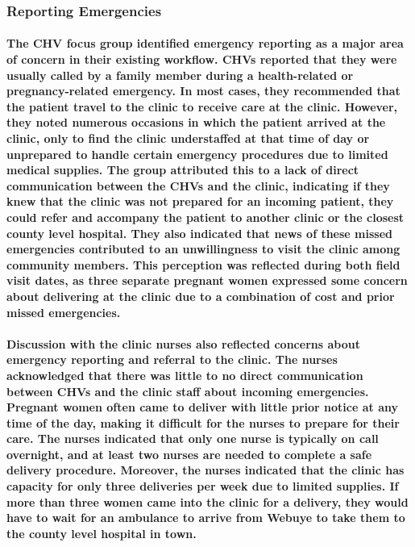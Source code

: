 \subsubsection{Reporting Emergencies}
\paragraph{The CHV focus group identified emergency reporting as a major area of concern in their existing workflow. CHVs reported that they were usually called by a family member during a health-related or pregnancy-related emergency. In most cases, they recommended that the patient travel to the clinic to receive care at the clinic. However, they noted numerous occasions in which the patient arrived at the clinic, only to find the clinic understaffed at that time of day or unprepared to handle certain emergency procedures due to limited medical supplies. The group attributed this to a lack of direct communication between the CHVs and the clinic, indicating if they knew that the clinic was not prepared for an incoming patient, they could refer and accompany the patient to another clinic or the closest county level hospital. They also indicated that news of these missed emergencies contributed to an unwillingness to visit the clinic among community members. This perception was reflected during both field visit dates, as three separate pregnant women expressed some concern about delivering at the clinic due to a combination of cost and prior missed emergencies.}

\paragraph{Discussion with the clinic nurses also reflected concerns about emergency reporting and referral to the clinic. The nurses acknowledged that there was little to no direct communication between CHVs and the clinic staff about incoming emergencies. Pregnant women often came to deliver with little prior notice at any time of the day, making it difficult for the nurses to prepare for their care. The nurses indicated that only one nurse is typically on call overnight, and at least two nurses are needed to complete a safe delivery procedure. Moreover, the nurses indicated that the clinic has capacity for only three deliveries per week due to limited supplies. If more than three women came into the clinic for a delivery, they would have to wait for an ambulance to arrive from Webuye to take them to the county level hospital in town.}

